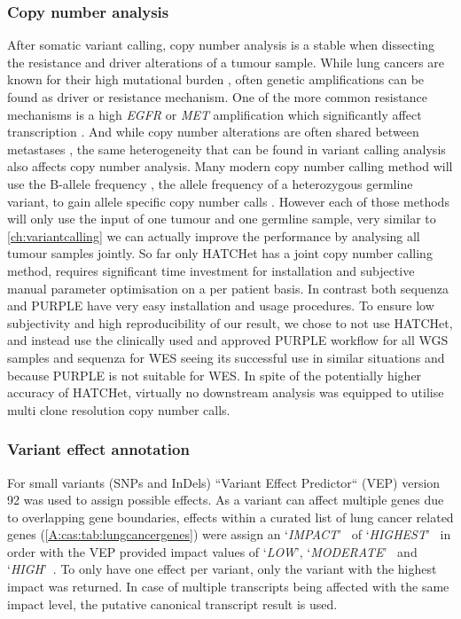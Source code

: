 \subsubsection{Copy number analysis}
\label{cascade-sec:cnv}
After somatic variant calling, copy number analysis is a stable when dissecting the resistance and driver alterations of a tumour sample. While lung cancers are known for their high mutational burden \cite{Alexandrov2020}, often genetic amplifications can be found as driver or resistance mechanism. One of the more common resistance mechanisms is a high \textit{EGFR} or \textit{MET} amplification which significantly affect transcription \cite{Bjaanaes2021}. And while copy number alterations are often shared between metastases \cite{Ni2013}, the same heterogeneity that can be found in variant calling analysis also affects copy number analysis. Many modern copy number calling method will use the B-allele frequency , the allele frequency of a heterozygous germline variant, to gain allele specific copy number calls \cite{Favero2015,Talevich2016,Cameron2019a}. However each of those methods will only use the input of one tumour and one germline sample, very similar to \autoref{ch:variantcalling} we can actually improve the performance by analysing all tumour samples jointly. So far only HATCHet \cite{Zaccaria2020} has a joint copy number calling method, requires significant time investment for installation and subjective manual parameter optimisation on a per patient basis. In contrast both sequenza and PURPLE have very easy installation and usage procedures. To ensure low subjectivity and high reproducibility of our result, we chose to not use HATCHet, and instead use the clinically used and approved PURPLE workflow for all WGS samples and sequenza for WES seeing its successful use in similar situations \cite{Leong2018,Vergara2021} and because PURPLE is not suitable for WES. In spite of the potentially higher accuracy of HATCHet, virtually no downstream analysis was equipped to utilise multi clone resolution copy number calls.


\subsubsection{Variant effect annotation}
\label{cascade-sec:vep}
For small variants (SNPs and InDels) ``Variant Effect Predictor`` (VEP) version 92 \cite{McLaren2016} was used to assign possible effects. As a variant can affect multiple genes due to overlapping gene boundaries, effects within a curated list of lung cancer related genes (\autoref{A:cas:tab:lungcancergenes}) were assign an \lq\emph{IMPACT}\rq~ of \lq\emph{HIGHEST}\rq~ in order with the VEP provided impact values of \lq\emph{LOW}\rq, \lq\emph{MODERATE}\rq~ and \lq\emph{HIGH}\rq~. To only have one effect per variant, only the variant with the highest impact was returned. In case of multiple transcripts being affected with the same impact level, the putative canonical transcript result is used.

